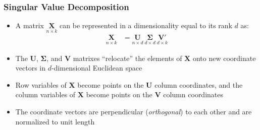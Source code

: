 \documentclass{beamer}
\begin{document}
\begin{frame}
	\frametitle{Singular Value Decomposition}  
	\begin{itemize}
		\item A matrix $\underset{n\times
			k}{\mathbf{X}}$ can be represented in a dimensionality equal to its
		rank $d$ as:
		\begin{align}
		\underset{n\times k}{\mathbf{X}} &= \underset{n\times d}{\mathbf{U}}
		\ 
		\underset{d\times d}{\mathbf{\Sigma}} \ \underset{d\times k}{\mathbf{V}'}
		\end{align}
		\item The \textbf{U}, $\mathbf{\Sigma}$, and \textbf{V} matrixes ``relocate''
		the elements of $\mathbf{X}$ onto new coordinate vectors in
		$d$-dimensional Euclidean space
		\item Row variables of \textbf{X} become points on the \textbf{U}
		column coordinates, and the column variables of \textbf{X} become
		points on the \textbf{V} column coordinates
		\item The coordinate vectors are perpendicular (\emph{orthogonal}) to
		each other and are normalized to unit length
	\end{itemize}
\end{frame}
\end{document}
